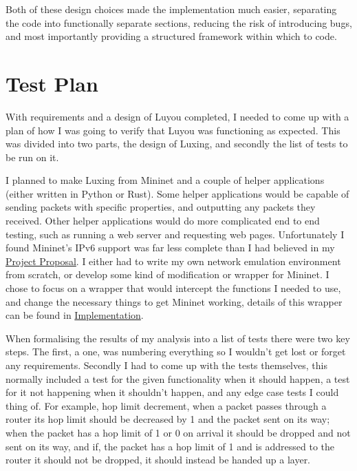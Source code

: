 \documentclass[12pt,a4paper,twoside,openright]{report}
\begin{document}
\bigskip

Both of these design choices made the implementation much easier, separating the code into functionally separate sections, reducing the risk of introducing bugs, and most importantly providing a structured framework within which to code.

\section{Test Plan}
\label{sec:test_plan}

With requirements and a design of Luyou completed, I needed to come up with a plan of how I was going to verify that Luyou was functioning as expected.  This was divided into two parts, the design of Luxing, and secondly the list of tests to be run on it.

\bigskip

I planned to make Luxing from Mininet and a couple of helper applications (either written in Python or Rust).  Some helper applications would be capable of sending packets with specific properties, and outputting any packets they received. Other helper applications would do more complicated end to end testing, such as running a web server and requesting web pages.  Unfortunately I found Mininet's IPv6 support was far less complete than I had believed in my \hyperref[project_proposal]{Project Proposal}.  I either had to write my own network emulation environment from scratch, or develop some kind of modification or wrapper for Mininet.  I chose to focus on a wrapper that would intercept the functions I needed to use, and change the necessary things to get Mininet working, details of this wrapper can be found in \hyperref[chap::implementation]{Implementation}.

\bigskip

When formalising the results of my analysis into a list of tests there were two key steps. The first, a one, was numbering everything so I wouldn't get lost or forget any requirements.  Secondly I had to come up with the tests themselves, this normally included a test for the given functionality when it should happen, a test for it not happening when it shouldn't happen, and any edge case tests I could thing of.  For example, hop limit decrement, when a packet passes through a router its hop limit should be decreased by 1 and the packet sent on its way; when the packet has a hop limit of 1 or 0 on arrival it should be dropped and not sent on its way, and if, the packet has a hop limit of 1 and is addressed to the router it should not be dropped, it should instead be handed up a layer. 
\end{document}
